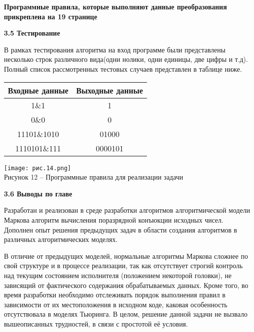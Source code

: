 \documentclass{article}
\begin{document}
\textbf{Программные правила, которые выполняют данные преобразования прикреплена на 19 странице}\\



\par \textbf{3.5 Тестирование}\\
\par В рамках тестирования алгоритма на вход программе были представлены несколько строк различного вида(одни нолики, одни единицы, две цифры и т.д). Полный список рассмотренных тестовых случаев представлен в таблице ниже.\\

\begin{center}
\begin{tabular}{|c|c|}
    \hline
    Входные данные & Выходные данные\\
    \hline
    1\&1  & 1 \\
    \hline
    0\&0 & 0 \\
    \hline
    11101\&1010 & 01000\\
    \hline
    1110101\&111 & 0000101 \\
    \hline
\end{tabular}
\end{center}


\begin{center}
    \texttt{[image: рис.14.png]}\\
    \small{Рисунок 12 – Программные правила для реализации задачи}
    \vspace{0.3cm}
\end{center}



\par \textbf{3.6 Выводы по главе}\\
\par Разработан и реализован в среде разработки алгоритмов алгоритмической модели Маркова алгоритм вычисления поразрядной конъюкции исходных чисел. Дополнен опыт решения предыдущих задач в области создания алгоритмов в различных алгоритмических моделях.\\

\par В отличие от предыдущих моделей, нормальные алгоритмы Маркова сложнее по свой структуре и в процессе реализации, так как отсутствует строгий контроль над текущим состоянием исполнителя (положением некоторой головки), не зависящий от фактического содержания обрабатываемых данных. Кроме того, во время разработки необходимо отслеживать порядок выполнения правил в зависимости от их местоположения в исходном коде, каковая особенность отсутствовала в моделях Тьюринга. В целом, решение данной задачи не вызвало вышеописанных трудностей, в связи с простотой её условия.\\
\end{document}

